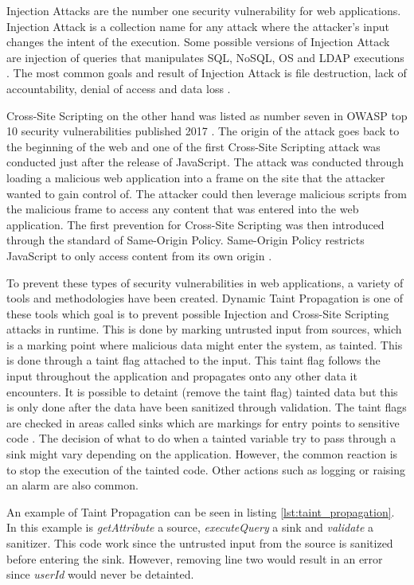 \documentclass{../kththesis}
\begin{document}
	Injection Attacks are the number one security vulnerability for web applications. Injection Attack is a collection name for any attack where the attacker’s input changes the intent of the execution. Some possible versions of Injection Attack are injection of queries that manipulates SQL, NoSQL, OS and LDAP executions \parencite{OWASP2017}. The most common goals and result of Injection Attack is file destruction, lack of accountability, denial of access and data loss \parencite{Secure_Web}.
	
	Cross-Site Scripting on the other hand was listed as number seven in OWASP top 10 security vulnerabilities published 2017 \parencite{OWASP2017}. The origin of the attack goes back to the beginning of the web and one of the first Cross-Site Scripting attack was conducted just after the release of JavaScript. The attack was conducted through loading a malicious web application into a frame on the site that the attacker wanted to gain control of. The attacker could then leverage malicious scripts from the malicious frame to access any content that was entered into the web application. The first prevention for Cross-Site Scripting was then introduced through the standard of Same-Origin Policy. Same-Origin Policy restricts JavaScript to only access content from its own origin \parencite{FogieSeth2007Xacs, w3csop}.
	
	To prevent these types of security vulnerabilities in web applications, a variety of tools and methodologies have been created. Dynamic Taint Propagation is one of these tools which goal is to prevent possible Injection and Cross-Site Scripting attacks in runtime. This is done by marking untrusted input from sources, which is a marking point where malicious data might enter the system, as tainted. This is done through a taint flag attached to the input. This taint flag follows the input throughout the application and propagates onto any other data it encounters. It is possible to detaint (remove the taint flag) tainted data but this is only done after the data have been sanitized through validation. The taint flags are checked in areas called sinks which are markings for entry points to sensitive code \parencite{Pan2015, Venkataramani2008}. The decision of what to do when a tainted variable try to pass through a sink might vary depending on the application. However, the common reaction is to stop the execution of the tainted code. Other actions such as logging or raising an alarm are also common. 
	
	An example of Taint Propagation can be seen in listing \ref{lst:taint_propagation}. In this example is \textit{getAttribute} a source, \textit{executeQuery} a sink and \textit{validate} a sanitizer. This code work since the untrusted input from the source is sanitized before entering the sink. However, removing line two would result in an error since \textit{userId} would never be detainted.
	
\end{document}
